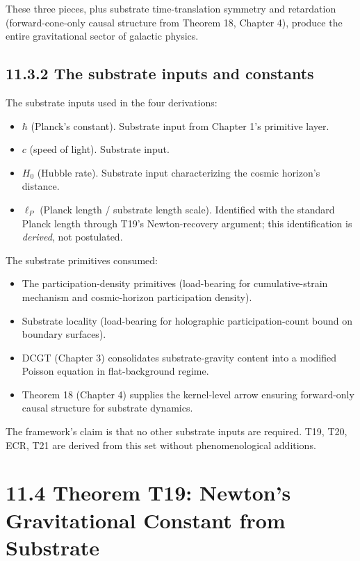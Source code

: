 \documentclass[11pt]{book}
\begin{document}
These three pieces, plus substrate time-translation symmetry and retardation (forward-cone-only causal structure from Theorem 18, Chapter 4), produce the entire gravitational sector of galactic physics.

\subsection{11.3.2 The substrate inputs and constants}

The substrate inputs used in the four derivations:

\begin{itemize}
\item $\hbar$ (Planck's constant). Substrate input from Chapter 1's primitive layer.
\item $c$ (speed of light). Substrate input.
\item $H_0$ (Hubble rate). Substrate input characterizing the cosmic horizon's distance.
\item $\ell_P$ (Planck length / substrate length scale). Identified with the standard Planck length through T19's Newton-recovery argument; this identification is \textit{derived}, not postulated.
\end{itemize}

The substrate primitives consumed:
\begin{itemize}
\item The participation-density primitives (load-bearing for cumulative-strain mechanism and cosmic-horizon participation density).
\item Substrate locality (load-bearing for holographic participation-count bound on boundary surfaces).
\item DCGT (Chapter 3) consolidates substrate-gravity content into a modified Poisson equation in flat-background regime.
\item Theorem 18 (Chapter 4) supplies the kernel-level arrow ensuring forward-only causal structure for substrate dynamics.
\end{itemize}

The framework's claim is that no other substrate inputs are required. T19, T20, ECR, T21 are derived from this set without phenomenological additions.

\section{11.4 Theorem T19: Newton's Gravitational Constant from Substrate}
\end{document}
